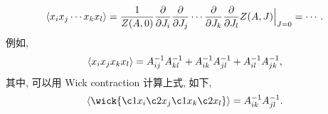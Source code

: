 \begin{itemize}
	\begin{tcolorbox}[title=calculation:]
		\begin{equation}
			\braket{x_i x_j \cdots x_k x_l} = \frac{1}{Z(A, 0)} \frac{\partial}{\partial J_i} \frac{\partial}{\partial J_j} \cdots \frac{\partial}{\partial J_k} \frac{\partial}{\partial J_l} Z(A, J) \Big|_{J = 0} = \cdots.
		\end{equation}
		例如,
		\begin{equation}
			\braket{x_i x_j x_k x_l} = A^{- 1}_{i j} A^{- 1}_{k l} + A^{- 1}_{i k} A^{- 1}_{j l} + A^{- 1}_{i l} A^{- 1}_{j k},
		\end{equation}
		其中, 可以用 Wick contraction 计算上式, 如下,
		\begin{equation}
			\braket{\wick{
				\c1 x_i \c2 x_j \c1 x_k \c2 x_l
			}} = A^{- 1}_{i k} A^{- 1}_{j l}.
		\end{equation}
	\end{tcolorbox}
\end{itemize}

